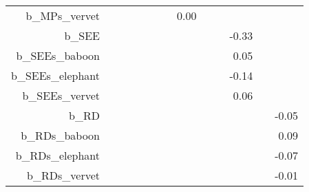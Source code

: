 \begin{table}[ht]
\begin{tabular}{rrrrrrrrrrrrr}
  b\_MPs\_vervet &  &  &  &  &  &  & 0.00 &  &  &  &  &  \\ 
  b\_SEE &  &  &  &  &  &  &  &  &  & -0.33 &  &  \\ 
  b\_SEEs\_baboon &  &  &  &  &  &  &  &  &  & 0.05 &  &  \\ 
  b\_SEEs\_elephant &  &  &  &  &  &  &  &  &  & -0.14 &  &  \\ 
  b\_SEEs\_vervet &  &  &  &  &  &  &  &  &  & 0.06 &  &  \\ 
  b\_RD &  &  &  &  &  &  &  &  &  &  &  & -0.05 \\ 
  b\_RDs\_baboon &  &  &  &  &  &  &  &  &  &  &  & 0.09 \\ 
  b\_RDs\_elephant &  &  &  &  &  &  &  &  &  &  &  & -0.07 \\ 
  b\_RDs\_vervet &  &  &  &  &  &  &  &  &  &  &  & -0.01 \\ 
   \hline
\end{tabular}
\end{table}

